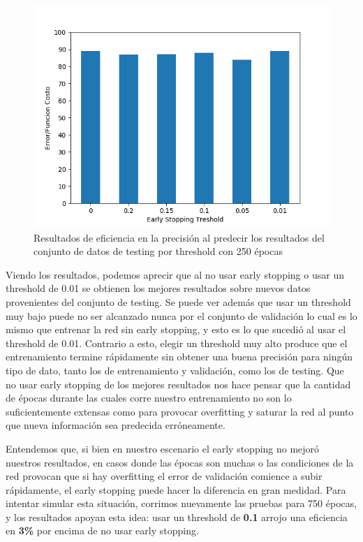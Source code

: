 \begin{figure}[!htbp]
  \begin{center}
  \includegraphics[scale=0.60]{graficos/early_stopping_testing_250ep.png}
  \caption{Resultados de eficiencia en la precisión al predecir los resultados del conjunto de datos de testing por threshold con 250 épocas}
  \end{center}
\end{figure}

Viendo los resultados, podemos aprecir que al no usar early stopping o usar un threshold de 0.01 se obtienen los mejores 
resultados sobre nuevos datos provenientes del conjunto de testing. Se puede ver además que usar un threshold muy bajo puede no ser alcanzado nunca por 
el conjunto de validación lo cual es lo mismo que entrenar la red sin early stopping, y esto es lo que sucedió al usar el threshold de 0.01. Contrario 
a esto, elegir un threshold muy alto produce que el entrenamiento termine rápidamente sin obtener una buena precisión para ningún tipo de dato, tanto 
los de entrenamiento y validación, como los de testing. Que no usar early stopping de los mejores resultados nos hace pensar que la cantidad de épocas 
durante las cuales corre nuestro entrenamiento no son lo suficientemente extensas como para provocar overfitting y saturar la red al punto que 
nueva información sea predecida erróneamente. 

Entendemos que, si bien en nuestro escenario el early stopping no mejoró nuestros resultados, en casos donde las épocas son muchas o las condiciones de 
la red provocan que si hay overfitting el error de validación comience a subir rápidamente, el early stopping puede hacer la diferencia en gran medidad. 
Para intentar simular esta situación, corrimos nuevamente las pruebas para 750 épocas, y los resultados apoyan esta idea: usar un threshold de \textbf{0.1} 
arrojo una eficiencia en \textbf{3\%} por encima de no usar early stopping.

